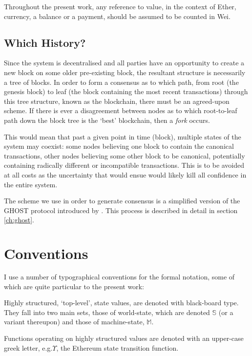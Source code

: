 \documentclass[9pt,oneside]{amsart}
\makeatletter
\newcommand*\eg{e.g.\@\xspace}
\makeatother
\begin{document}
\begin{multicols}{2}
Throughout the present work, any reference to value, in the context of Ether, currency, a balance or a payment, should be assumed to be counted in Wei.

\subsection{Which History?}

Since the system is decentralised and all parties have an opportunity to create a new block on some older pre-existing block, the resultant structure is necessarily a tree of blocks. In order to form a consensus as to which path, from root (the genesis block) to leaf (the block containing the most recent transactions) through this tree structure, known as the blockchain, there must be an agreed-upon scheme. If there is ever a disagreement between nodes as to which root-to-leaf path down the block tree is the `best' blockchain, then a \textit{fork} occurs.

This would mean that past a given point in time (block), multiple states of the system may coexist: some nodes believing one block to contain the canonical transactions, other nodes believing some other block to be canonical, potentially containing radically different or incompatible transactions. This is to be avoided at all costs as the uncertainty that would ensue would likely kill all confidence in the entire system.

The scheme we use in order to generate consensus is a simplified version of the GHOST protocol introduced by \cite{cryptoeprint:2013:881}. This process is described in detail in section \ref{ch:ghost}.

\section{Conventions}\label{ch:conventions}

I use a number of typographical conventions for the formal notation, some of which are quite particular to the present work:

Highly structured, `top-level', state values, are denoted with black-board type. They fall into two main sets, those of world-state, which are denoted $\mathbb{S}$ (or a variant thereupon) and those of machine-state, $\mathbb{M}$.

Functions operating on highly structured values are denoted with an upper-case greek letter, \eg $\Upsilon$, the Ethereum state transition function.


\end{multicols}
\end{document}
